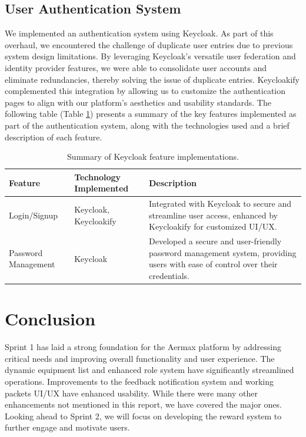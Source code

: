\subsection{User Authentication System}
We implemented an authentication system using Keycloak. As part of this overhaul, we encountered the challenge of duplicate user entries due to previous system design limitations. By leveraging Keycloak’s versatile user federation and identity provider features, we were able to consolidate user accounts and eliminate redundancies, thereby solving the issue of duplicate entries. Keycloakify complemented this integration by allowing us to customize the authentication pages to align with our platform's aesthetics and usability standards. The following table (Table \ref{tab:keycloak_features}) presents a summary of the key features implemented as part of the authentication system, along with the technologies used and a brief description of each feature.

\begin{table}[H]
\centering
\begin{tabularx}{\textwidth}{|X|X|X|}
\hline
\textbf{Feature} & \textbf{Technology Implemented} & \textbf{Description} \\
\hline
Login/Signup & Keycloak, Keycloakify & Integrated with Keycloak to secure and streamline user access, enhanced by Keycloakify for customized UI/UX. \\
\hline
Password Management & Keycloak & Developed a secure and user-friendly password management system, providing users with ease of control over their credentials. \\
\hline
\end{tabularx}
\caption{Summary of Keycloak feature implementations.}
\label{tab:keycloak_features}
\end{table}

\setcounter{secnumdepth}{0}
\section{Conclusion}
Sprint 1 has laid a strong foundation for the Aermax platform by addressing critical needs and improving overall functionality and user experience. The dynamic equipment list and enhanced role system have significantly streamlined operations. Improvements to the feedback notification system and working packets UI/UX have enhanced usability. While there were many other enhancements not mentioned in this report, we have covered the major ones. Looking ahead to Sprint 2, we will focus on developing the reward system to further engage and motivate users.

